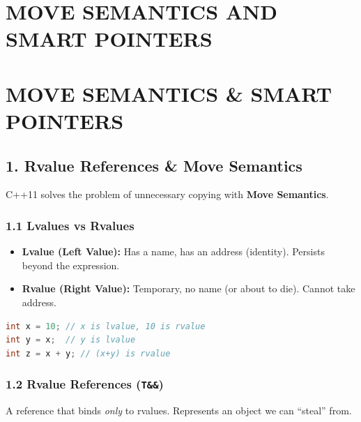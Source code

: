 \hypertarget{move-semantics-and-smart-pointers}{%
\chapter{MOVE SEMANTICS AND SMART
POINTERS}\label{move-semantics-and-smart-pointers}}

\hypertarget{move-semantics-smart-pointers}{%
\chapter{MOVE SEMANTICS \& SMART
POINTERS}\label{move-semantics-smart-pointers}}

\hypertarget{rvalue-references-move-semantics}{%
\section{1. Rvalue References \& Move
Semantics}\label{rvalue-references-move-semantics}}

C++11 solves the problem of unnecessary copying with \textbf{Move
Semantics}.

\hypertarget{lvalues-vs-rvalues}{%
\subsection{1.1 Lvalues vs Rvalues}\label{lvalues-vs-rvalues}}

\begin{itemize}
\tightlist
\item
  \textbf{Lvalue (Left Value):} Has a name, has an address (identity).
  Persists beyond the expression.
\item
  \textbf{Rvalue (Right Value):} Temporary, no name (or about to die).
  Cannot take address.
\end{itemize}

\begin{lstlisting}[language={C++}]
int x = 10; // x is lvalue, 10 is rvalue
int y = x;  // y is lvalue
int z = x + y; // (x+y) is rvalue
\end{lstlisting}

\hypertarget{rvalue-references-t}{%
\subsection{\texorpdfstring{1.2 Rvalue References
(\texttt{T\&\&})}{1.2 Rvalue References (T\&\&)}}\label{rvalue-references-t}}

A reference that binds \emph{only} to rvalues. Represents an object we
can ``steal'' from.

